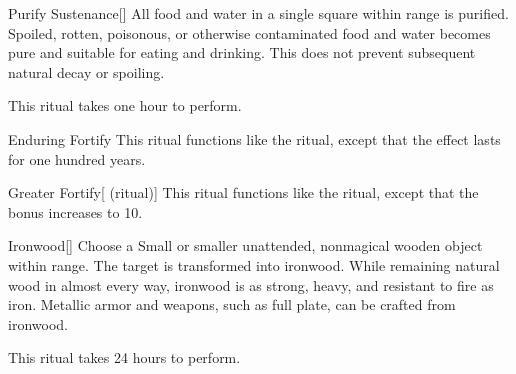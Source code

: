 \lowercase{\hypertarget{spell:Purify Sustenance}{}}\label{spell:Purify Sustenance}
\begin{freeability}[\nth{1}]{\hypertarget{spell:Purify Sustenance}{Purify Sustenance}}[]
All food and water in a single square within \rngclose range is purified.
Spoiled, rotten, poisonous, or otherwise contaminated food and water becomes pure and suitable for eating and drinking.
This does not prevent subsequent natural decay or spoiling.

This ritual takes one hour to perform.
\end{freeability}
\vspace{0.25em}



\lowercase{\hypertarget{spell:Enduring Fortify}{}}\label{spell:Enduring Fortify}
\begin{freeability}[\nth{3}]{\hypertarget{spell:Enduring Fortify}{Enduring Fortify}}
This ritual functions like the  ritual, except that the effect lasts for one hundred years.
\end{freeability}
\vspace{0.25em}



\lowercase{\hypertarget{spell:Greater Fortify}{}}\label{spell:Greater Fortify}
\begin{attuneability}[\nth{3}]{\hypertarget{spell:Greater Fortify}{Greater Fortify}}[ (ritual)]
This ritual functions like the  ritual, except that the  bonus increases to 10.
\end{attuneability}
\vspace{0.25em}



\lowercase{\hypertarget{spell:Ironwood}{}}\label{spell:Ironwood}
\begin{freeability}[\nth{3}]{\hypertarget{spell:Ironwood}{Ironwood}}[]
Choose a Small or smaller unattended, nonmagical wooden object within \rngclose range.
The target is transformed into ironwood.
While remaining natural wood in almost every way, ironwood is as strong, heavy, and resistant to fire as iron.
Metallic armor and weapons, such as full plate, can be crafted from ironwood.

This ritual takes 24 hours to perform.
\end{freeability}
\vspace{0.25em}



